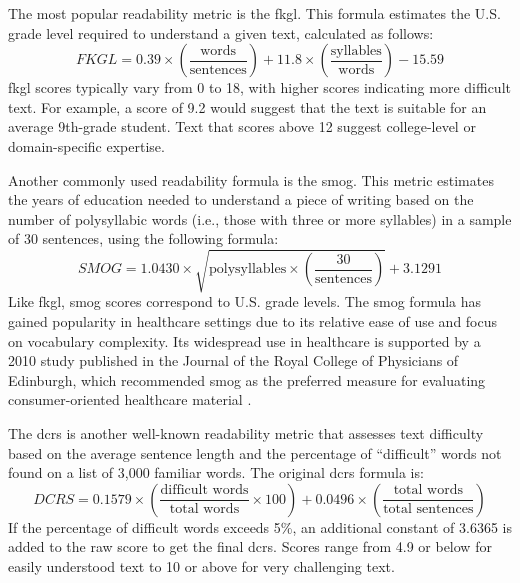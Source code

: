 The most popular readability metric is the \gls{fkgl}. This formula estimates the U.S. grade level required to understand a given text, calculated as follows:
\begin{equation}
    \label{eq:fkgl}
    FKGL = 0.39 \times \left(\frac{\text{words}}{\text{sentences}}\right) + 11.8 \times \left(\frac{\text{syllables}}{\text{words}}\right) - 15.59
\end{equation}
\gls{fkgl} scores typically vary from 0 to 18, with higher scores indicating more difficult text. For example, a score of 9.2 would suggest that the text is suitable for an average 9th-grade student. Text that scores above 12 suggest college-level or domain-specific expertise.

Another commonly used readability formula is the \gls{smog}. 
This metric estimates the years of education needed to understand a piece of writing based on the number of polysyllabic words (i.e., those with three or more syllables) in a sample of 30 sentences, using the following formula:
\begin{equation}
    \label{eq:smog}
    SMOG = 1.0430 \times \sqrt{\text{polysyllables} \times \left(\frac{30}{\text{sentences}}\right)} + 3.1291
\end{equation}
Like \gls{fkgl}, \gls{smog} scores correspond to U.S. grade levels. 
The \gls{smog} formula has gained popularity in healthcare settings due to its relative ease of use and focus on vocabulary complexity. Its widespread use in healthcare is supported by a 2010 study published in the Journal of the Royal College of Physicians of Edinburgh, which recommended \gls{smog} as the preferred measure for evaluating consumer-oriented healthcare material \cite{Fitzsimmons2010-mq}.

The \gls{dcrs} is another well-known readability metric that assesses text difficulty based on the average sentence length and the percentage of ``difficult'' words not found on a list of 3,000 familiar words. The original \gls{dcrs} formula is:
\begin{equation}
    \label{eq:dcrs}
    DCRS = 0.1579 \times \left(\frac{\text{difficult words}}{\text{total words}} \times 100\right) + 0.0496 \times \left(\frac{\text{total words}}{\text{total sentences}}\right)
\end{equation}
If the percentage of difficult words exceeds 5\%, an additional constant of 3.6365 is added to the raw score to get the final \gls{dcrs}. Scores range from 4.9 or below for easily understood text to 10 or above for very challenging text.

